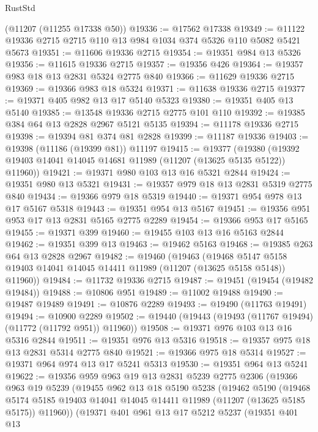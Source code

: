 \begin{lexlean}{RustStd}
\begin{coremodule}
    (@11207 (@11255 @17338 @50))
@19336 := @17562 @17338
@19349 := @11122 @19336 @2715 @2715 @110 @13 @984 @1034 @374 @5326 @110 @5082 @5421 @5673
@19351 := @11606 @19336 @2715
@19354 := @19351 @984 @13 @5326
@19356 := @11615 @19336 @2715
@19357 := @19356 @426
@19364 := @19357 @983 @18 @13 @2831 @5324 @2775 @840
@19366 := @11629 @19336 @2715
@19369 := @19366 @983 @18 @5324
@19371 := @11638 @19336 @2715
@19377 := @19371 @405 @982 @13 @17 @5140 @5323
@19380 := @19351 @405 @13 @5140
@19385 := @13548 @19336 @2715 @2775 @101 @110
@19392 := @19385 @384 @64 @13 @2828 @2967 @5121 @5135
@19394 := @11178 @19336 @2715
@19398 := @19394 @81 @374 @81 @2828
@19399 := @11187 @19336
@19403 := @19398 (@11186 (@19399 @81)) @11197
@19415 := @19377
    (@19380 (@19392 @19403 @14041 @14045 @14681 @11989 (@11207 (@13625 @5135 @5122)) @11960))
@19421 := @19371 @980 @103 @13 @16 @5321 @2844
@19424 := @19351 @980 @13 @5321
@19431 := @19357 @979 @18 @13 @2831 @5319 @2775 @840
@19434 := @19366 @979 @18 @5319
@19440 := @19371 @954 @978 @13 @17 @5167 @5318
@19443 := @19351 @954 @13 @5167
@19451 := @19356 @951 @953 @17 @13 @2831 @5165 @2775 @2289
@19454 := @19366 @953 @17 @5165
@19455 := @19371 @399
@19460 := @19455 @103 @13 @16 @5163 @2844
@19462 := @19351 @399 @13
@19463 := @19462 @5163
@19468 := @19385 @263 @64 @13 @2828 @2967
@19482 := @19460
    (@19463
      (@19468 @5147 @5158 @19403 @14041 @14045 @14411 @11989 (@11207 (@13625 @5158 @5148)) @11960))
@19484 := @11732 @19336 @2715
@19487 := @19451 (@19454 (@19482 @19484))
@19488 := @10806 @951
@19489 := @11002 @19488
@19490 := @19487 @19489
@19491 := @10876 @2289
@19493 := @19490 (@11763 @19491)
@19494 := @10900 @2289
@19502 := @19440 (@19443 (@19493 (@11767 @19494) (@11772 (@11792 @951)) @11960))
@19508 := @19371 @976 @103 @13 @16 @5316 @2844
@19511 := @19351 @976 @13 @5316
@19518 := @19357 @975 @18 @13 @2831 @5314 @2775 @840
@19521 := @19366 @975 @18 @5314
@19527 := @19371 @964 @974 @13 @17 @5241 @5313
@19530 := @19351 @964 @13 @5241
@19622 := @19356
    @959
    @963
    @19
    @13
    @2831
    @5239
    @2775
    @2306
    (@19366
      @963
      @19
      @5239
      (@19455
        @962
        @13
        @18
        @5190
        @5238
        (@19462
          @5190
          (@19468
            @5174
            @5185
            @19403
            @14041
            @14045
            @14411
            @11989
            (@11207 (@13625 @5185 @5175))
            @11960))
        (@19371
          @401
          @961
          @13
          @17
          @5212
          @5237
          (@19351
            @401
            @13

\end{coremodule}
\end{lexlean}
